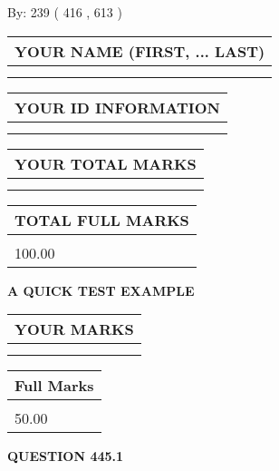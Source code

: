 \documentclass[12pt]{article}
\begin{document}
   
\hspace{1.0in} By: 
 239 ( 416 ,  613 )
   
   
   
   
\newpage 
\setcounter{page}{ 
   445001 } 
   
   
   
   
\noindent\begin{tabular}{|l|}
\hline
YOUR NAME (FIRST, ... LAST)  \\
\hline
 \\ 
 \\ 
\hline
\end{tabular}
\hspace{0.05in} \begin{tabular}{|l|}
\hline
 YOUR   ID   INFORMATION  \\
\hline
 \\ 
 \\ 
\hline
\end{tabular}
   
   
\vspace{0.2in}\noindent\begin{tabular}{|l|}
\hline
YOUR TOTAL MARKS  \\
\hline
 \\ 
 \\ 
\hline
\end{tabular}
\hspace{0.05in} \begin{tabular}{|l|}
\hline
TOTAL FULL MARKS  \\
\hline
 \\ 
100.00 \\
\hline
\end{tabular}
   
   
 \vspace{0.2in}
{\LARGE {\textbf{ A QUICK TEST EXAMPLE}}}
   
   
  
\vspace{0.2in}
  
\noindent\begin{tabular}{|l|}
\hline
 YOUR MARKS  \\
\hline
 \\ 
 \\ 
\hline
\end{tabular}
\hspace{0.05in} \begin{tabular}{|l|}
\hline
 Full Marks  \\
\hline
 \\ 
50.00 \\
\hline
\end{tabular}
{\textbf{\Large{QUESTION
445.1 
}}}
  
\end{document}

